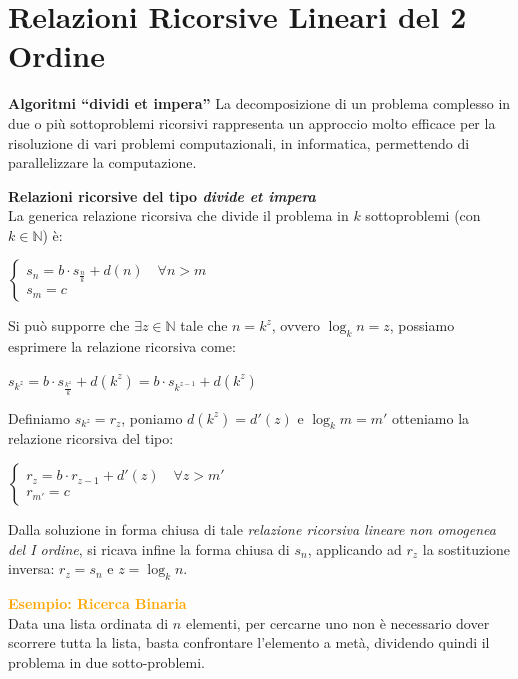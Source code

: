 \newpage
\section{Relazioni Ricorsive Lineari del 2 Ordine}
\begin{flushleft}
    \textbf{Algoritmi ``dividi et impera''}
    La decomposizione di un problema complesso in due o più sottoproblemi ricorsivi rappresenta un approccio molto efficace per la risoluzione di vari problemi computazionali, in informatica, permettendo di parallelizzare la computazione.

    \textbf{Relazioni ricorsive del tipo \textit{divide et impera}} \\
    La generica relazione ricorsiva che divide il problema in $k$ sottoproblemi (con $k \in \mathbb{N}$) è:

    {\centering
        $\begin{cases}
            s_n = b \cdot s_{\frac{n}{k}} + d(n) \quad \forall n > m \\
            s_m = c
        \end{cases}$
    \par}
    Si può supporre che $\exists z \in \mathbb{N}$ tale che $n = k^z$, ovvero $\log_k n = z$, possiamo esprimere la relazione ricorsiva come:

    {\centering
        $s_{k^z} = b \cdot s_{\frac{k^z}{k}} + d(k^z) = b \cdot s_{k^{z-1}} + d(k^z)$
    \par}

    Definiamo $s_{k^z} = r_z$, poniamo $d(k^z) = d'(z)$ e $\log_k m = m'$ otteniamo la relazione ricorsiva del tipo:

    {\centering
        $\begin{cases}
            r_z = b \cdot r_{z-1} + d'(z) \quad \forall z > m' \\
            r_{m'} = c
        \end{cases}$
    \par}
    Dalla soluzione in forma chiusa di tale \textit{relazione ricorsiva lineare non omogenea del I ordine}, si ricava infine la forma chiusa di $s_n$, applicando ad $r_z$ la sostituzione inversa: $r_z = s_n$ e $z = \log_k n$.
    \begin{boxA}
        \textcolor{orange}{\textbf{Esempio: Ricerca Binaria}} \\
        Data una lista ordinata di $n$ elementi, per cercarne uno non è necessario dover scorrere tutta la lista, basta confrontare l'elemento a metà, dividendo quindi il problema in due sotto-problemi. 


\end{boxA}
\end{flushleft}
